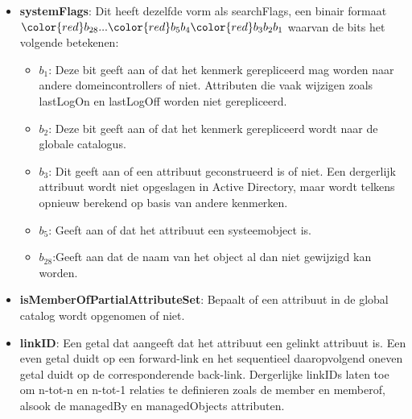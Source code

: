 \begin{enumerate}
{\begin{itemize}
\begin{itemize}
					\item \textbf{$b_6$}: Deze bit instellen versnelt opzoekingen waarin kenmerken met wildcards vermeld worden. Deze tuple indexen worden best zeldzaam gebruikt, aangezien ze veel resources in beslag nemen.
					\item \textbf{$b_8$}: 
					\item \textbf{$b_{10}$}: 
				\end{itemize}
				\item \textbf{systemFlags}: Dit heeft dezelfde vorm als searchFlags, een binair formaat ${\color{red}b_{28}}...{\color{red}b_{5}}b_{4}{\color{red}b_3b_2b_1}$ waarvan de bits het volgende betekenen:
				\begin{itemize}
					\item \textbf{$b_1$}: Deze bit geeft aan of dat het kenmerk gerepliceerd mag worden naar andere domeincontrollers of niet. Attributen die vaak wijzigen zoals lastLogOn en lastLogOff worden niet gerepliceerd.
					\item \textbf{$b_2$}: Deze bit geeft aan of dat het kenmerk gerepliceerd wordt naar de globale catalogus.
					\item \textbf{$b_3$}: Dit geeft aan of een attribuut geconstrueerd is of niet. Een dergerlijk attribuut wordt niet opgeslagen in Active Directory, maar wordt telkens opnieuw berekend op basis van andere kenmerken.
					\item \textbf{$b_5$}: Geeft aan of dat het attribuut een systeemobject is.
					\item \textbf{$b_{28}$}:Geeft aan dat de naam van het object al dan niet gewijzigd kan worden. 
				\end{itemize}
				\item \textbf{isMemberOfPartialAttributeSet}: Bepaalt of een attribuut in de global catalog wordt opgenomen of niet.
				\item \textbf{linkID}: Een getal dat aangeeft dat het attribuut een gelinkt attribuut is. Een even getal duidt op een forward-link en het sequentieel daaropvolgend oneven getal duidt op de corresponderende back-link. Dergerlijke linkIDs laten toe om n-tot-n en n-tot-1 relaties te definieren zoals de member en memberof, alsook de managedBy en managedObjects attributen. 
			\end{itemize}
		}
		

\end{enumerate}
